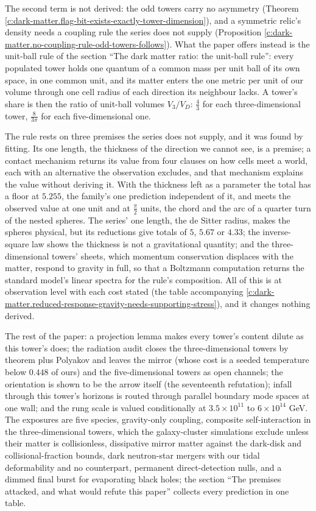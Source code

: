 \documentclass[11pt]{article}
\theoremstyle{definition}
\theoremstyle{plain}
\begin{document}
The second term is not derived: the odd towers carry no asymmetry (Theorem \ref{c:dark-matter.flag-bit-exists-exactly-tower-dimension}), and a symmetric relic's density needs a coupling rule the series does not supply (Proposition \ref{c:dark-matter.no-coupling-rule-odd-towers-follows}). What the paper offers instead is the unit-ball rule of the section ``The dark matter ratio: the unit-ball rule'': every populated tower holds one quantum of a common mass per unit ball of its own space, in one common unit, and its matter enters the one metric per unit of our volume through one cell radius of each direction its neighbour lacks. A tower's share is then the ratio of unit-ball volumes $V_{3}/V_{D}$: $\tfrac{4}{3}$ for each three-dimensional tower, $\tfrac{8}{3\pi}$ for each five-dimensional one.

The rule rests on three premises the series does not supply, and it was found by fitting. Its one length, the thickness of the direction we cannot see, is a premise; a contact mechanism returns its value from four clauses on how cells meet a world, each with an alternative the observation excludes, and that mechanism explains the value without deriving it. With the thickness left as a parameter the total has a floor at $5.255$, the family's one prediction independent of it, and meets the observed value at one unit and at $\tfrac{\pi}{2}$ units, the chord and the arc of a quarter turn of the nested spheres. The series' one length, the de Sitter radius, makes the spheres physical, but its reductions give totals of $5$, $5.67$ or $4.33$; the inverse-square law shows the thickness is not a gravitational quantity; and the three-dimensional towers' sheets, which momentum conservation displaces with the matter, respond to gravity in full, so that a Boltzmann computation returns the standard model's linear spectra for the rule's composition. All of this is at observation level with each cost stated (the table accompanying \ref{c:dark-matter.reduced-response-gravity-needs-supporting-stress}), and it changes nothing derived.

The rest of the paper: a projection lemma makes every tower's content dilute as this tower's does; the radiation audit closes the three-dimensional towers by theorem plus Polyakov and leaves the mirror (whose cost is a seeded temperature below $0.448$ of ours) and the five-dimensional towers as open channels; the orientation is shown to be the arrow itself (the seventeenth refutation); infall through this tower's horizons is routed through parallel boundary mode spaces at one wall; and the rung scale is valued conditionally at $3.5 \times 10^{11}$ to $6 \times 10^{14}$ GeV. The exposures are five species, gravity-only coupling, composite self-interaction in the three-dimensional towers, which the galaxy-cluster simulations exclude unless their matter is collisionless, dissipative mirror matter against the dark-disk and collisional-fraction bounds, dark neutron-star mergers with our tidal deformability and no counterpart, permanent direct-detection nulls, and a dimmed final burst for evaporating black holes; the section ``The premises attacked, and what would refute this paper'' collects every prediction in one table.
\end{document}
